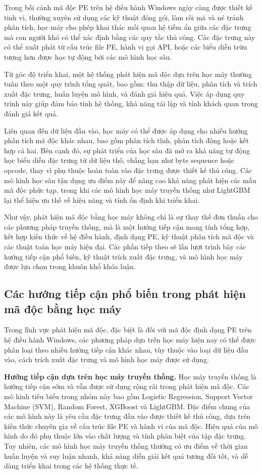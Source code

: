 Trong bối cảnh mã độc PE trên hệ điều hành Windows ngày càng được
thiết kế tinh vi, thường xuyên sử dụng các kỹ thuật đóng gói, làm rối
mã và né tránh phân tích, học máy cho phép khai thác mối quan hệ tiềm
ẩn giữa các đặc trưng mà con người khó có thể xác định bằng các quy
tắc thủ công. Các đặc trưng này có thể xuất phát từ cấu trúc file PE,
hành vi gọi API, hoặc các biểu diễn trừu tượng hơn được học tự động
bởi các mô hình học sâu.

Từ góc độ triển khai, một hệ thống phát hiện mã độc dựa trên học máy
thường tuân theo một quy trình tổng quát, bao gồm: thu thập dữ liệu,
phân tích và trích xuất đặc trưng, huấn luyện mô hình, và đánh giá
hiệu quả. Việc áp dụng quy trình này giúp đảm bảo tính hệ thống, khả
năng tái lập và tính khách quan trong đánh giá kết quả.

Liên quan đến dữ liệu đầu vào, học máy có thể được áp dụng cho nhiều
hướng phân tích mã độc khác nhau, bao gồm phân tích tĩnh, phân tích
động hoặc kết hợp cả hai. Bên cạnh đó, sự phát triển của học sâu đã mở ra khả năng tự động học
biểu diễn đặc trưng từ dữ liệu thô, chẳng hạn như byte sequence hoặc
opcode, thay vì phụ thuộc hoàn toàn vào đặc trưng được thiết kế thủ
công. Các mô hình học sâu tận dụng ưu điểm này để nâng cao khả năng
phát hiện các mẫu mã độc phức tạp, trong khi các mô hình học máy
truyền thống như LightGBM lại thể hiện ưu thế về hiệu năng và tính ổn
định khi triển khai.

Như vậy, phát hiện mã độc bằng học máy không chỉ là sự thay thế đơn
thuần cho các phương pháp truyền thống, mà là một hướng tiếp cận mang
tính tổng hợp, kết hợp kiến thức về hệ điều hành, định dạng PE, kỹ
thuật phân tích mã độc và các thuật toán học máy hiện đại. Các phần
tiếp theo sẽ lần lượt trình bày các hướng tiếp cận phổ biến, kỹ thuật
trích xuất đặc trưng, và mô hình học máy được lựa chọn trong khuôn
khổ khóa luận.

\subsection{Các hướng tiếp cận phổ biến trong phát hiện mã độc bằng học máy}

Trong lĩnh vực phát hiện mã độc, đặc biệt là đối với mã độc định dạng
PE trên hệ điều hành Windows, các phương pháp dựa trên học máy hiện
nay có thể được phân loại theo nhiều hướng tiếp cận khác nhau, tùy
thuộc vào loại dữ liệu đầu vào, cách trích xuất đặc trưng và mô hình
học máy được sử dụng.

\textbf{Hướng tiếp cận dựa trên học máy truyền thống.}
Học máy truyền thống là hướng tiếp cận sớm và vẫn được sử dụng rộng
rãi trong phát hiện mã độc. Các mô hình tiêu biểu trong nhóm này bao
gồm Logistic Regression, Support Vector Machine (SVM), Random Forest,
XGBoost và LightGBM. Đặc điểm chung của các mô hình này là yêu cầu
đặc trưng đầu vào được thiết kế thủ công, dựa trên kiến thức chuyên
gia về cấu trúc file PE và hành vi của mã độc. Hiệu quả của mô hình
do đó phụ thuộc lớn vào chất lượng và tính phân biệt của tập đặc
trưng. Tuy nhiên, các mô hình học máy truyền thống thường có ưu điểm
về thời gian huấn luyện và suy luận nhanh, khả năng diễn giải kết quả
tương đối tốt, và dễ dàng triển khai trong các hệ thống thực tế.

